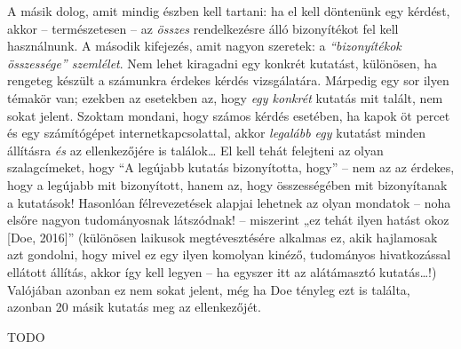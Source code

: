 \documentclass[magyar,]{book}
\begin{document}
A másik dolog, amit mindig észben kell tartani: ha el kell döntenünk egy kérdést, akkor -- természetesen -- az \emph{összes} rendelkezésre álló bizonyítékot fel kell használnunk. A második kifejezés, amit nagyon szeretek: a \emph{\enquote{bizonyítékok összessége} szemlélet}. Nem lehet kiragadni egy konkrét kutatást, különösen, ha rengeteg készült a számunkra érdekes kérdés vizsgálatára. Márpedig egy sor ilyen témakör van; ezekben az esetekben az, hogy \emph{egy konkrét} kutatás mit talált, nem sokat jelent. Szoktam mondani, hogy számos kérdés esetében, ha kapok öt percet és egy számítógépet internetkapcsolattal, akkor \emph{legalább egy} kutatást minden állításra \emph{és} az ellenkezőjére is találok\ldots{} El kell tehát felejteni az olyan szalagcímeket, hogy \enquote{A legújabb kutatás bizonyította, hogy} -- nem az az érdekes, hogy a legújabb mit bizonyított, hanem az, hogy összességében mit bizonyítanak a kutatások! Hasonlóan félrevezetések alapjai lehetnek az olyan mondatok -- noha elsőre nagyon tudományosnak látszódnak! -- miszerint „ez tehát ilyen hatást okoz {[}Doe, 2016{]}'' (különösen laikusok megtévesztésére alkalmas ez, akik hajlamosak azt gondolni, hogy mivel ez egy ilyen komolyan kinéző, tudományos hivatkozással ellátott állítás, akkor így kell legyen -- ha egyszer itt az alátámasztó kutatás\ldots!) Valójában azonban ez nem sokat jelent, még ha Doe tényleg ezt is találta, azonban 20 másik kutatás meg az ellenkezőjét.

TODO
\end{document}
